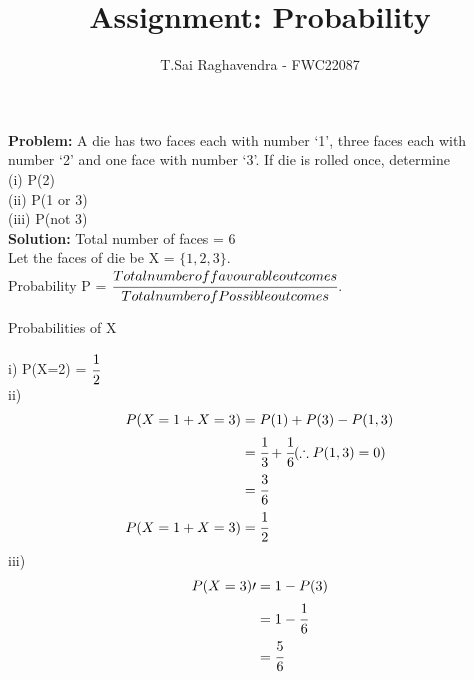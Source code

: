 \documentclass{article}
\newcommand{\Problem}{\noindent \textbf{Problem: }}
\newcommand{\solution}{\noindent \textbf{Solution: }}
\begin{document}
\title{Assignment: Probability}
\author{\Large T.Sai Raghavendra - FWC22087}
\date{}


\maketitle

\Problem A die has two faces each with number ‘1’, three faces each with number ‘2’ and
one face with number ‘3’. If die is rolled once, determine\\
(i) P(2) \\(ii) P(1 or 3) \\(iii) P(not 3)\\

\solution
Total number of faces = 6\\
Let the faces of die be X = $\{1,2,3\}$.\\
Probability P = $\cfrac{Total number of favourable outcomes}{Total number of Possible outcomes}$.

	\begin{table}[h!]
	\small
	\centering
	
	\caption{Probabilities of X}
	\label{tables:table1}
	\end{table}
i) P(X=2) = $\cfrac{1}{2}$\\  %
	
ii) 
\begin{align}
P(X=1 + X=3)	=& \; P(1) + P(3) - P(1,3)\\
				=& \; \cfrac{1}{3} + \cfrac{1}{6}   (\therefore P(1,3) = 0)\\
				=& \; \cfrac{3}{6}\\
P(X=1 + X=3) 	=& \; \cfrac{1}{2}
\end{align}
iii)
\begin{align}
P(X=3)\prime =& \; 1 - P(3)\\
			 =& \; 1 - \cfrac{1}{6}\\
			 =& \; \cfrac{5}{6}
\end{align}
\end{document}
